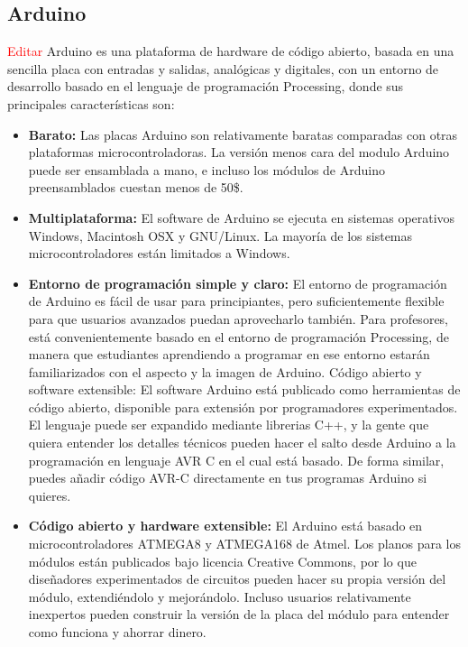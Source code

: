 \documentclass[12pt,a4paper]{article}
\begin{document}
 \subsection{Arduino}
 \textcolor{red}{Editar}
	Arduino\cite{ARDUINO} es una plataforma de hardware de código abierto, basada en una sencilla placa con entradas y salidas, analógicas y digitales, con un entorno de desarrollo basado en el lenguaje de programación Processing, donde sus principales características son:
\begin{itemize}
	\item \textbf{Barato:} Las placas Arduino son relativamente baratas comparadas con otras plataformas microcontroladoras. La versión menos cara del modulo Arduino puede ser ensamblada a mano, e incluso los módulos de Arduino preensamblados cuestan menos de 50\$.
	\item \textbf{Multiplataforma:} El software de Arduino se ejecuta en sistemas operativos Windows, Macintosh OSX y GNU/Linux. La mayoría de los sistemas microcontroladores están limitados a Windows.
\item \textbf{Entorno de programación simple y claro:} El entorno de programación de Arduino es fácil de usar para principiantes, pero suficientemente flexible para que usuarios avanzados puedan aprovecharlo también. Para profesores, está convenientemente basado en el entorno de programación Processing, de manera que estudiantes aprendiendo a programar en ese entorno estarán familiarizados con el aspecto y la imagen de Arduino.
Código abierto y software extensible: El software Arduino está publicado como herramientas de código abierto, disponible para extensión por programadores experimentados. El lenguaje puede ser expandido mediante librerias C++, y la gente que quiera entender los detalles técnicos pueden hacer el salto desde Arduino a la programación en lenguaje AVR C en el cual está basado. De forma similar, puedes añadir código AVR-C directamente en tus programas Arduino si quieres.
\item \textbf{Código abierto y hardware extensible:} El Arduino está basado en microcontroladores ATMEGA8 y ATMEGA168 de Atmel. Los planos para los módulos están publicados bajo licencia Creative Commons, por lo que diseñadores experimentados de circuitos pueden hacer su propia versión del módulo, extendiéndolo y mejorándolo. Incluso usuarios relativamente inexpertos pueden construir la versión de la placa del módulo para entender como funciona y ahorrar dinero.
\end{itemize}
\end{document}
